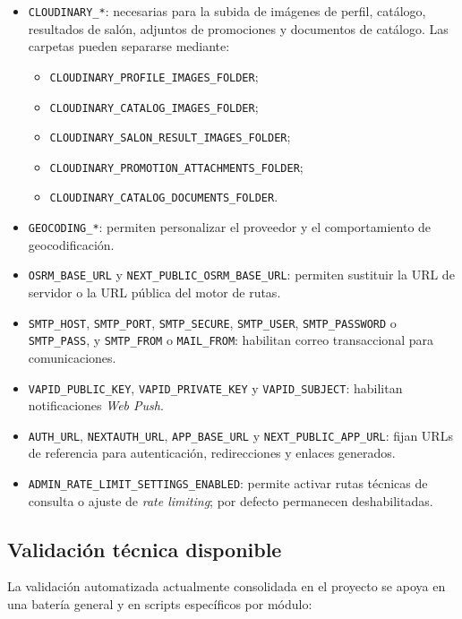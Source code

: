 \begin{itemize}
    \item \texttt{CLOUDINARY\_*}: necesarias para la subida de imágenes de perfil, catálogo, resultados de salón, adjuntos de promociones y documentos de catálogo. Las carpetas pueden separarse mediante:
    \begin{itemize}[nosep]
        \item \texttt{CLOUDINARY\_PROFILE\_IMAGES\_FOLDER};
        \item \texttt{CLOUDINARY\_CATALOG\_IMAGES\_FOLDER};
        \item \texttt{CLOUDINARY\_SALON\_RESULT\_IMAGES\_FOLDER};
        \item \texttt{CLOUDINARY\_PROMOTION\_ATTACHMENTS\_FOLDER};
        \item \texttt{CLOUDINARY\_CATALOG\_DOCUMENTS\_FOLDER}.
    \end{itemize}
    \item \texttt{GEOCODING\_*}: permiten personalizar el proveedor y el comportamiento de geocodificación.
    \item \texttt{OSRM\_BASE\_URL} y \texttt{NEXT\_PUBLIC\_OSRM\_BASE\_URL}: permiten sustituir la URL de servidor o la URL pública del motor de rutas.
    \item \texttt{SMTP\_HOST}, \texttt{SMTP\_PORT}, \texttt{SMTP\_SECURE}, \texttt{SMTP\_USER}, \texttt{SMTP\_PASSWORD} o \texttt{SMTP\_PASS}, y \texttt{SMTP\_FROM} o \texttt{MAIL\_FROM}: habilitan correo transaccional para comunicaciones.
    \item \texttt{VAPID\_PUBLIC\_KEY}, \texttt{VAPID\_PRIVATE\_KEY} y \texttt{VAPID\_SUBJECT}: habilitan notificaciones \textit{Web Push}.
    \item \texttt{AUTH\_URL}, \texttt{NEXTAUTH\_URL}, \texttt{APP\_BASE\_URL} y \texttt{NEXT\_PUBLIC\_APP\_URL}: fijan URLs de referencia para autenticación, redirecciones y enlaces generados.
    \item \texttt{ADMIN\_RATE\_LIMIT\_SETTINGS\_ENABLED}: permite activar rutas técnicas de consulta o ajuste de \textit{rate limiting}; por defecto permanecen deshabilitadas.
\end{itemize}

\subsection{Validación técnica disponible}

La validación automatizada actualmente consolidada en el proyecto se apoya en una batería general y en scripts específicos por módulo:


